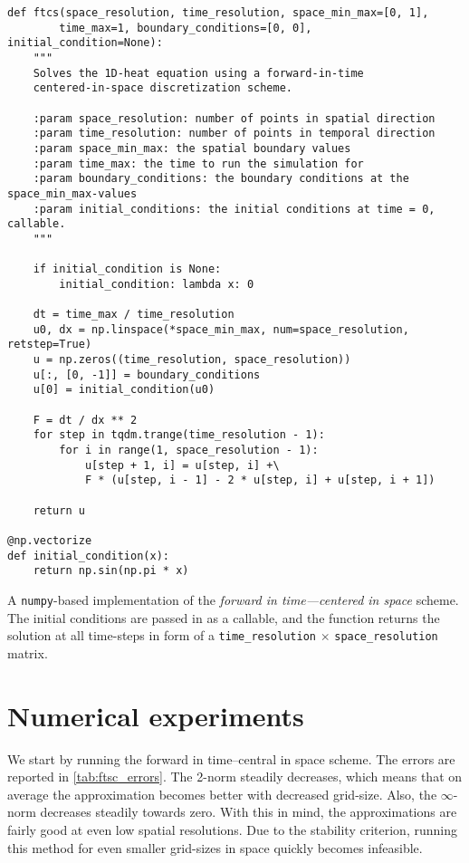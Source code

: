 \documentclass[article, a4paper, oneside]{memoir}
\begin{document}
	
	\begin{listing}
		\centering
		\begin{verbatim}
def ftcs(space_resolution, time_resolution, space_min_max=[0, 1],
		time_max=1, boundary_conditions=[0, 0], initial_condition=None):
    """
    Solves the 1D-heat equation using a forward-in-time 
    centered-in-space discretization scheme.

    :param space_resolution: number of points in spatial direction
    :param time_resolution: number of points in temporal direction
    :param space_min_max: the spatial boundary values
    :param time_max: the time to run the simulation for
    :param boundary_conditions: the boundary conditions at the space_min_max-values
    :param initial_conditions: the initial conditions at time = 0, callable.
    """

    if initial_condition is None:
        initial_condition: lambda x: 0

    dt = time_max / time_resolution
    u0, dx = np.linspace(*space_min_max, num=space_resolution, retstep=True)
    u = np.zeros((time_resolution, space_resolution))
    u[:, [0, -1]] = boundary_conditions
    u[0] = initial_condition(u0)

    F = dt / dx ** 2
    for step in tqdm.trange(time_resolution - 1):
        for i in range(1, space_resolution - 1):
            u[step + 1, i] = u[step, i] +\ 
	    	F * (u[step, i - 1] - 2 * u[step, i] + u[step, i + 1])

    return u			

@np.vectorize
def initial_condition(x):
    return np.sin(np.pi * x)
		\end{verbatim}
		\caption{A \texttt{numpy}-based implementation of the
			\emph{forward in time---centered in space} scheme. The
			initial conditions are passed in as a callable, and the
			function returns the solution at all time-steps in form
			of a \texttt{time\_resolution} \(\times\)
		\texttt{space\_resolution} matrix.}
		\label{lst:ftcs}
	\end{listing}

	\chapter{Numerical experiments}
	
	We start by running the forward in time--central in space scheme. The
	errors are reported in \cref{tab:ftsc_errors}. The 2-norm steadily
	decreases, which means that on average the approximation becomes better
	with decreased grid-size. Also, the \( \infty\)-norm decreases steadily
	towards zero. With this in mind, the approximations are fairly good at
	even low spatial resolutions. Due to the stability criterion, running
	this method for even smaller grid-sizes in space quickly becomes
	infeasible.
\end{document}
